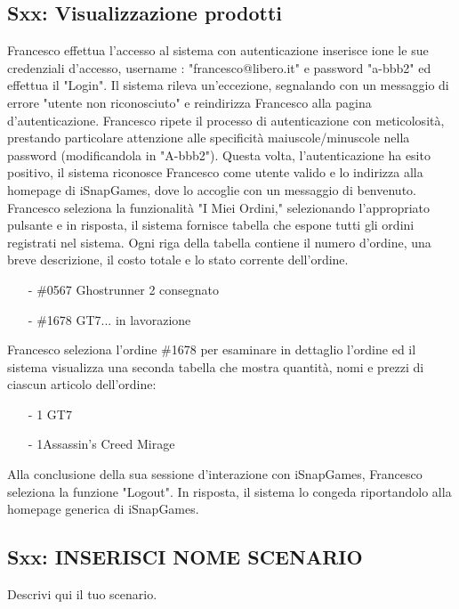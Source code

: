 \documentclass[12pt, a4paper, oneside]{book}
\begin{document}
    \subsection*{Sxx: Visualizzazione prodotti}
    Francesco effettua l'accesso al sistema con autenticazione inserisce ione le sue credenziali d'accesso, username :
     "francesco@libero.it" e password "a-bbb2" ed effettua il "Login". Il sistema rileva un'eccezione, segnalando con un
    messaggio di errore "utente non riconosciuto" e reindirizza Francesco alla pagina d'autenticazione. Francesco ripete
    il processo di autenticazione con meticolosità, prestando particolare attenzione alle specificità maiuscole/minuscole
    nella password (modificandola in "A-bbb2"). Questa volta, l'autenticazione ha esito positivo, il sistema riconosce
    Francesco come utente valido e lo indirizza alla homepage di iSnapGames, dove lo accoglie con un messaggio di benvenuto.
    Francesco seleziona la funzionalità "I Miei Ordini," selezionando l'appropriato pulsante e in risposta, il sistema
    fornisce tabella che espone tutti gli ordini registrati nel sistema. Ogni riga della tabella contiene il numero
    d'ordine, una breve descrizione, il costo totale e lo stato corrente dell'ordine.
    \begin{itemize}
        \item [-] \#0567 Ghostrunner 2 		consegnato
        \item [-] \#1678 GT7... 	in lavorazione
    \end{itemize}
    Francesco seleziona l'ordine \#1678 per esaminare in dettaglio l'ordine ed il  sistema visualizza una seconda tabella
    che mostra quantità, nomi e prezzi di ciascun articolo dell'ordine:
    \begin{itemize}
        \setlength\itemsep{.05cm}
        \item [-] 1	GT7 
        \item [-] 1Assassin's Creed Mirage	
    \end{itemize}
    Alla conclusione della sua sessione d'interazione con iSnapGames, Francesco seleziona la funzione
    "Logout". In risposta, il sistema lo congeda riportandolo alla homepage generica di iSnapGames.

    \subsection*{Sxx: INSERISCI NOME SCENARIO}
        Descrivi qui il tuo scenario.
\end{document}
